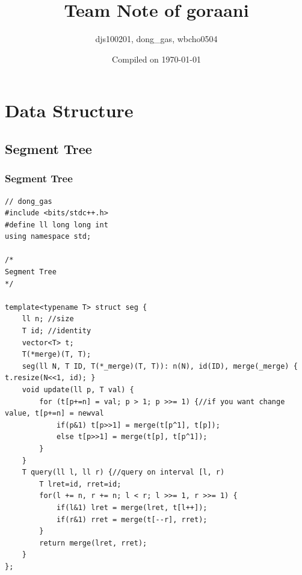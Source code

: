 \documentclass[landscape, 8pt, a4paper, oneside, twocolumn]{extarticle}
\title{Team Note of goraani}
\author{djs100201, dong\_gas, wbcho0504}
\date{Compiled on \today}
\begin{document}
{
	\Large
	\maketitle
    \tableofcontents
}
\thispagestyle{fancy}
\pagebreak
\section{Data Structure}
\subsection{Segment Tree}
\subsubsection {Segment Tree}
\begin{verbatim}
// dong_gas
#include <bits/stdc++.h>
#define ll long long int
using namespace std;

/*
Segment Tree
*/

template<typename T> struct seg {
	ll n; //size
	T id; //identity
	vector<T> t;
	T(*merge)(T, T);
	seg(ll N, T ID, T(*_merge)(T, T)): n(N), id(ID), merge(_merge) { t.resize(N<<1, id); }					
	void update(ll p, T val) {
		for (t[p+=n] = val; p > 1; p >>= 1) {//if you want change value, t[p+=n] = newval
			if(p&1) t[p>>1] = merge(t[p^1], t[p]);
			else t[p>>1] = merge(t[p], t[p^1]);
		}
	}
	T query(ll l, ll r) {//query on interval [l, r)
		T lret=id, rret=id;
		for(l += n, r += n; l < r; l >>= 1, r >>= 1) {
			if(l&1) lret = merge(lret, t[l++]);
			if(r&1) rret = merge(t[--r], rret);
		}
		return merge(lret, rret);
	}
};
\end{verbatim}
\end{document}
